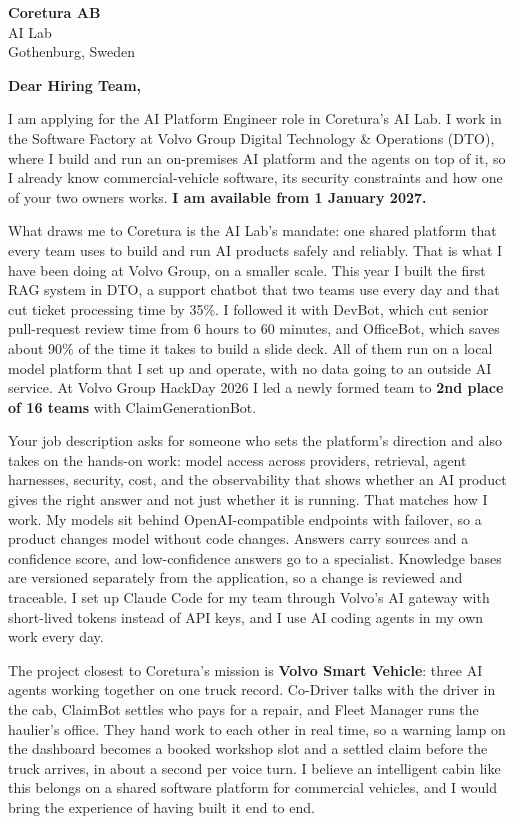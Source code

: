 \documentclass[a4paper,10pt]{article}
\begin{document}
\pagestyle{empty}

{\color{darkblue}
\textbf{Coretura AB}\\
AI Lab\\
Gothenburg, Sweden
}

\vspace{14pt}

\textbf{Dear Hiring Team,}


I am applying for the AI Platform Engineer role in Coretura's AI Lab. I work in the Software Factory at Volvo Group Digital Technology \& Operations (DTO), where I build and run an on-premises AI platform and the agents on top of it, so I already know commercial-vehicle software, its security constraints and how one of your two owners works. \textbf{I am available from 1 January 2027.}


What draws me to Coretura is the AI Lab's mandate: one shared platform that every team uses to build and run AI products safely and reliably. That is what I have been doing at Volvo Group, on a smaller scale. This year I built the first RAG system in DTO, a support chatbot that two teams use every day and that cut ticket processing time by 35\%. I followed it with DevBot, which cut senior pull-request review time from 6 hours to 60 minutes, and OfficeBot, which saves about 90\% of the time it takes to build a slide deck. All of them run on a local model platform that I set up and operate, with no data going to an outside AI service. At Volvo Group HackDay 2026 I led a newly formed team to \textbf{2nd place of 16 teams} with ClaimGenerationBot.


Your job description asks for someone who sets the platform's direction and also takes on the hands-on work: model access across providers, retrieval, agent harnesses, security, cost, and the observability that shows whether an AI product gives the right answer and not just whether it is running. That matches how I work. My models sit behind OpenAI-compatible endpoints with failover, so a product changes model without code changes. Answers carry sources and a confidence score, and low-confidence answers go to a specialist. Knowledge bases are versioned separately from the application, so a change is reviewed and traceable. I set up Claude Code for my team through Volvo's AI gateway with short-lived tokens instead of API keys, and I use AI coding agents in my own work every day.


The project closest to Coretura's mission is \textbf{Volvo Smart Vehicle}: three AI agents working together on one truck record. Co-Driver talks with the driver in the cab, ClaimBot settles who pays for a repair, and Fleet Manager runs the haulier's office. They hand work to each other in real time, so a warning lamp on the dashboard becomes a booked workshop slot and a settled claim before the truck arrives, in about a second per voice turn. I believe an intelligent cabin like this belongs on a shared software platform for commercial vehicles, and I would bring the experience of having built it end to end.
\end{document}
